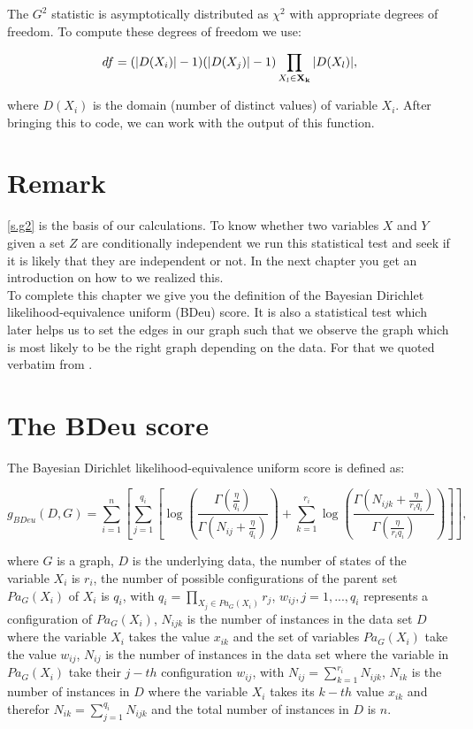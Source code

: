 		The $G^{2}$ statistic is asymptotically distributed as $\chi^{2}$ with appropriate degrees of freedom. To compute these degrees of freedom we use:

		\begin{equation}
			df = (|D(X_{i})| - 1)(|D(X_{j})| - 1) \prod_{X_{l} \in {\textbf{X}}_{{\textbf{k}}}} |D(X_{l})|,
		\end{equation}

		where $D(X_{i})$ is the domain (number of distinct values) of variable $X_{i}$. After bringing this to code, we can work with the output of this function.

	\section*{Remark}

		\autoref{s.g2} is the basis of our calculations. To know whether two variables $X$ and $Y$ given a set $Z$ are conditionally independent we run this statistical test and seek if it is likely that they are independent or not. In the next chapter you get an introduction on how to we realized this. \\
		To complete this chapter we give you the definition of the Bayesian Dirichlet likelihood-equivalence uniform (BDeu) score. It is also a statistical test which later helps us to set the edges in our graph such that we observe the graph which is most likely to be the right graph depending on the data. For that we quoted verbatim from \cite{Ca06}.

	\section*{The BDeu score} \label{s.BDeu}

		The Bayesian Dirichlet likelihood-equivalence uniform score is defined as:

		\begin{equation}
			g_{BDeu}(D, G) = \sum_{i = 1}^{n} \left[ \sum_{j = 1}^{q_{i}} \left[ \log\left( \frac{\Gamma (\frac{\eta}{q_{i}})}{\Gamma (N_{ij} + \frac{\eta}{q_{i}})} \right) + \sum_{k = 1}^{r_{i}} \log \left( \frac{\Gamma (N_{ijk} + \frac{\eta}{r_{i} q_{i}})}{\Gamma (\frac{\eta}{r_{i} q_{i}})} \right) \right] \right],
		\end{equation}

		where $G$ is a graph, $D$ is the underlying data, the number of states of the variable $X_{i}$ is $r_{i}$, the number of possible configurations of the parent set $Pa_{G}(X_{i})$ of $X_{i}$ is $q_{i}$, with $q_{i} = \prod_{X_{j} \in Pa_{G}(X_{i})} r_{j}$, $w_{ij}, j = 1,...,q_{i}$ represents a configuration of $Pa_{G}(X_{i})$, $N_{ijk}$ is the number of instances in the data set $D$ where the variable $X_{i}$ takes the value $x_{ik}$ and the set of variables $Pa_{G}(X_{i})$ take the value $w_{ij}$, $N_{ij}$ is the number of instances in the data set where the variable in $Pa_{G}(X_{i})$ take their $j-th$ configuration $w_{ij}$, with $N_{ij} = \sum_{k = 1}^{r_{i}} N_{ijk}$, $N_{ik}$ is the number of instances in $D$ where the variable $X_{i}$ takes its $k-th$ value $x_{ik}$ and therefor $N_{ik} = \sum_{j = 1}^{q_{i}} N_{ijk}$ and the total number of instances in $D$ is $n$.

